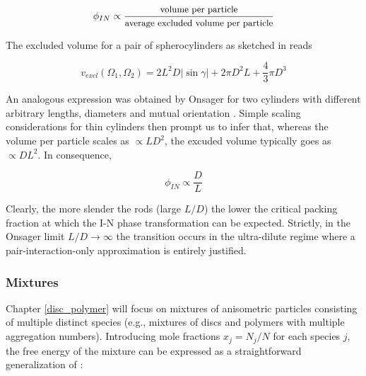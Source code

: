 \begin{equation}
\phi_{IN} \propto \frac{\mbox{{\small volume per particle}}}{\mbox{{\small average excluded volume per particle}}}
\end{equation}

The excluded volume for a pair of spherocylinders as sketched in  reads

\begin{equation}
v_{excl}(\Omega_1,\Omega_2) = 2L^2D |\sin\gamma|+2\pi D^2 L + \frac{4}{3}\pi D^3
\end{equation}

An analogous expression was obtained by Onsager for two cylinders with different arbitrary lengths, diameters and mutual orientation \cite{onsager1949}. Simple scaling considerations for thin cylinders then prompt us to infer that, whereas the volume per particle scales as $\propto L D^2$, the excuded volume typically goes as $\propto D L^2$. In consequence,


\begin{equation}
\phi_{IN} \propto \frac{D}{L}
\end{equation}

Clearly, the more slender the rods (large $L/D$) the lower the critical packing fraction at which the I-N phase transformation can be expected. Strictly, in the Onsager limit $L/D \rightarrow \infty$ the transition occurs in the ultra-dilute regime where a pair-interaction-only approximation is entirely justified.

\subsubsection{Mixtures}

Chapter \ref{disc_polymer} will focus on mixtures of anisometric particles consisting of multiple distinct species (e.g., mixtures of discs and polymers with multiple aggregation numbers). Introducing mole fractions $x_{j}=N_{j}/N$ for each species $j$, the free energy of the mixture can be expressed as a straightforward generalization of :

